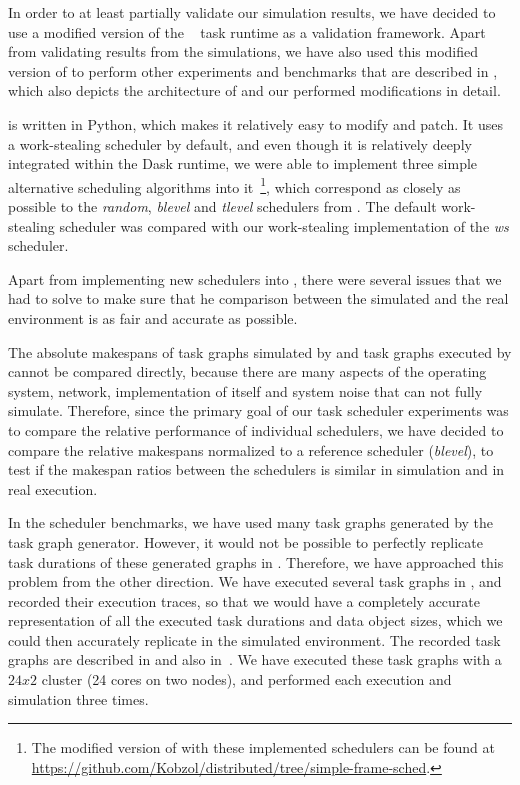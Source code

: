 In order to at least partially validate our simulation results, we have decided to use a modified
version of the \dask{}~\cite{dask} task runtime as a validation
framework. Apart from validating results from the \estee{} simulations, we have also
used this modified version of \dask{} to perform other experiments and benchmarks
that are described in , which also depicts the architecture of
\dask{} and our performed modifications in detail.

\dask{} is written in Python, which makes it relatively easy to modify and patch.
It uses a work-stealing scheduler by default, and even though it is relatively deeply integrated
within the Dask runtime, we were able to implement three simple alternative scheduling algorithms
into it~\footnote{The modified version of \dask{} with these implemented schedulers can be found at
\url{https://github.com/Kobzol/distributed/tree/simple-frame-sched}.}, which correspond as closely as possible to the
\emph{random}, \emph{blevel} and \emph{tlevel} schedulers from
\estee{}. The default work-stealing scheduler was compared with our work-stealing
implementation of the \emph{ws} scheduler.

Apart from implementing new schedulers into \dask{}, there were several issues that
we had to solve to make sure that he comparison between the simulated and the real environment is
as fair and accurate as possible.

The absolute makespans of task graphs simulated by \estee{} and task graphs executed
by \dask{} cannot be compared directly, because there are many aspects of the
operating system, network, implementation of \dask{} itself and system noise that
\estee{} can not fully simulate. Therefore, since the primary goal of our task
scheduler experiments was to compare the relative performance of individual schedulers, we have
decided to compare the relative makespans normalized to a reference scheduler
(\emph{blevel}), to test if the makespan ratios between the schedulers is similar in
simulation and in real execution.

In the scheduler benchmarks, we have used many task graphs generated by the \estee{}
task graph generator. However, it would not be possible to perfectly replicate task durations of
these generated graphs in \dask{}. Therefore, we have approached this problem from
the other direction. We have executed several task graphs in \dask{}, and recorded
their execution traces, so that we would have a completely accurate representation of all the
executed task durations and data object sizes, which we could then accurately replicate in the
simulated \estee{} environment. The recorded task graphs are described in
 and also in~\cite{rsds}. We have executed these task graphs
with a $24x2$ cluster (24 cores on two nodes), and performed each execution and
simulation three times.

